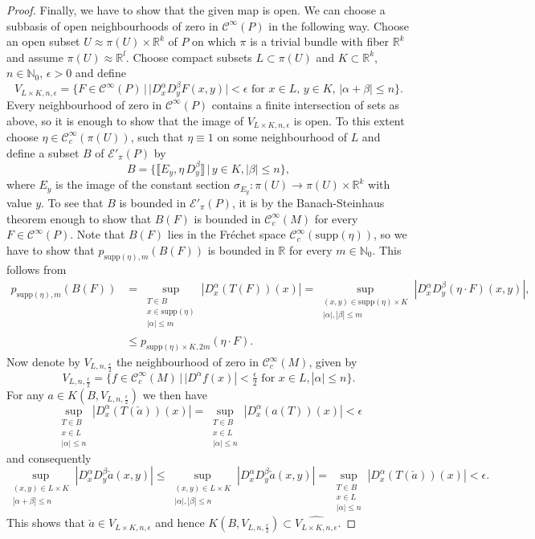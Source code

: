 \documentclass[a4paper]{amsart}
\newcommand{\RR}{\mathbb{R}}
\newcommand{\NN}{\mathbb{N}}
\newcommand{\cE}{\mathcal{E}}
\newcommand{\supp}{\mathord{\mathrm{supp}}}
\newcommand{\C}{\mathord{\mathcal{C}^{\infty}}}
\newcommand{\Cc}{\mathord{\mathcal{C}^{\infty}_{c}}}
\begin{document}
\begin{proof}
Finally, we have to show that the given map is open. We can choose a subbasis of open neighbourhoods of zero in $\C(P)$
in the following way. Choose an open subset $U\approx\pi(U)\times\RR^{k}$ of $P$ on which $\pi$ is a trivial bundle with fiber $\RR^{k}$ and
assume $\pi(U)\approx\RR^{l}$. Choose compact subsets $L\subset\pi(U)$ and $K\subset\RR^{k}$, $n\in\NN_{0}$, $\epsilon>0$ and define
\[
V_{L\times K,n,\epsilon}=\{F\in\C(P)\,|\,|D^{\alpha}_{x}D^{\beta}_{y}F(x,y)|<\epsilon\text{ for }x\in L,\,y\in K,\,|\alpha+\beta|\leq n\}.
\]
Every neighbourhood of zero in $\C(P)$ contains a finite intersection of sets as above, so it is enough to show that 
the image of $V_{L\times K,n,\epsilon}$ is open. To this extent choose $\eta\in\Cc(\pi(U))$, such that $\eta\equiv 1$
on some neighbourhood of $L$ and define a subset $B$ of $\cE'_{\pi}(P)$ by
\[
B=\{\llbracket E_{y},\eta\,D_{y}^{\beta}\rrbracket\,|\,y\in K,|\beta|\leq n\},
\]
where $E_{y}$ is the image of the constant section $\sigma_{E_{y}}:\pi(U)\to\pi(U)\times\RR^{k}$ with value $y$. To see that $B$ is bounded
in $\cE'_{\pi}(P)$, it is by the Banach-Steinhaus theorem enough to show that $B(F)$ is bounded in $\Cc(M)$ for every $F\in\C(P)$.
Note that $B(F)$ lies in the Fr\'{e}chet space $\Cc(\supp(\eta))$, so we have to show that $p_{\supp(\eta),m}(B(F))$ is bounded in $\RR$
for every $m\in\NN_{0}$. This follows from
\begin{align*}
p_{\supp(\eta),m}(B(F))&=\sup_{\substack{T\in B\\ x\in\supp(\eta) \\ |\alpha|\leq m}}|D^{\alpha}_{x}(T(F))(x)|
=\sup_{\substack{(x,y)\in\supp(\eta)\times K \\ |\alpha|,|\beta|\leq m}}|D^{\alpha}_{x}D^{\beta}_{y}(\eta\cdot F)(x,y)|, \\
&\leq p_{\supp(\eta)\times K,2m}(\eta\cdot F).
\end{align*}
Now denote by $V_{L,n,\frac{\epsilon}{2}}$ the neighbourhood of zero in $\Cc(M)$, given by
\[
V_{L,n,\frac{\epsilon}{2}}=\{f\in\Cc(M)\,|\,|D^{\alpha}f(x)|<\tfrac{\epsilon}{2}\text{ for }x\in L,|\alpha|\leq n\}.
\]
For any $a\in K(B,V_{L,n,\frac{\epsilon}{2}})$ we then have
\[
\sup_{\substack{T\in B\\ x\in L \\ |\alpha|\leq n}}|D^{\alpha}_{x}(T(\check{a}))(x)|
=\sup_{\substack{T\in B\\ x\in L \\ |\alpha|\leq n}}|D^{\alpha}_{x}(a(T))(x)|<\epsilon
\]
and consequently
\[
\sup_{\substack{(x,y)\in L\times K \\ |\alpha+\beta|\leq n}}|D^{\alpha}_{x}D^{\beta}_{y}\check{a}(x,y)|
\leq \sup_{\substack{(x,y)\in L\times K \\ |\alpha|,|\beta|\leq n}}|D^{\alpha}_{x}D^{\beta}_{y}\check{a}(x,y)|
=\sup_{\substack{T\in B\\ x\in L \\ |\alpha|\leq n}}|D^{\alpha}_{x}(T(\check{a}))(x)|<\epsilon.
\]
This shows that $\check{a}\in V_{L\times K,n,\epsilon}$ and hence $K(B,V_{L,n,\frac{\epsilon}{2}})\subset \widehat{V_{L\times K,n,\epsilon}}$.
\end{proof}
\end{document}
